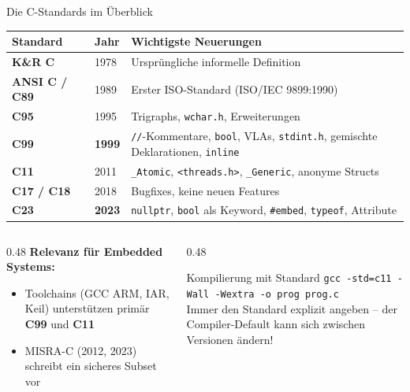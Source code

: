 \documentclass[%
  aspectratio=169,
  10pt
]{beamer}
\begin{document}
\begin{frame}{Die C-Standards im Überblick}
  \begin{block}{}
    \small
    \begin{tabular}{>{\bfseries}l l p{8cm}}
      \toprule
      Standard      & Jahr  & Wichtigste Neuerungen \\
      \midrule
      K\&R C        & 1978  & Ursprüngliche informelle Definition \\
      ANSI C / C89  & 1989  & Erster ISO-Standard (ISO/IEC 9899:1990) \\
      C95           & 1995  & Trigraphs, \texttt{wchar.h}, Erweiterungen \\
      \textcolor{fbblau}{\textbf{C99}} & \textcolor{fbblau}{\textbf{1999}}
                             & \texttt{//}-Kommentare, \texttt{bool}, VLAs, \texttt{stdint.h},
                               gemischte Deklarationen, \texttt{inline} \\
      C11           & 2011  & \texttt{\_Atomic}, \texttt{<threads.h>}, \texttt{\_Generic},
                               anonyme Structs \\
      C17 / C18     & 2018  & Bugfixes, keine neuen Features \\
      \textcolor{fbblau}{\textbf{C23}} & \textcolor{fbblau}{\textbf{2023}}
                             & \texttt{nullptr}, \texttt{bool} als Keyword, \texttt{\#embed},
                               \texttt{typeof}, Attribute \\
      \bottomrule
    \end{tabular}
  \end{block}

  \vspace{0.3em}
  \begin{columns}[T]
    \begin{column}{0.48\textwidth}
      \textbf{Relevanz für Embedded Systems:}
      \begin{itemize}
        \item Toolchains (GCC ARM, IAR, Keil) unterstützen primär \textbf{C99} und \textbf{C11}
        \item MISRA-C (2012, 2023) schreibt ein sicheres Subset vor
      \end{itemize}
    \end{column}
    \begin{column}{0.48\textwidth}
      \begin{alertblock}{Kompilierung mit Standard}
        \texttt{gcc -std=c11 -Wall -Wextra -o prog prog.c}\\[0.2em]
        Immer den Standard explizit angeben -- der Compiler-Default
        kann sich zwischen Versionen ändern!
      \end{alertblock}
    \end{column}
  \end{columns}
\end{frame}
\end{document}
